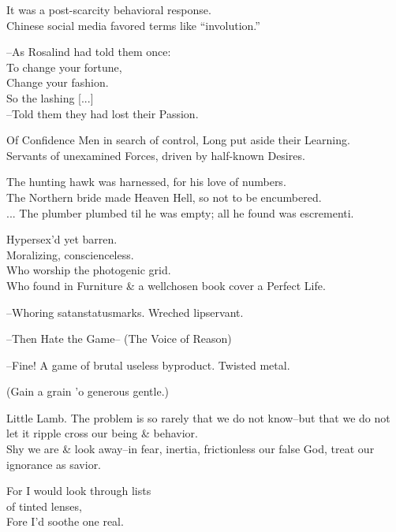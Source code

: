 \secdiv

It was a post-scarcity behavioral response. \\
Chinese social media favored terms like ``involution.''

--As Rosalind had told them once: \\
\qquad To change your fortune, \\
\qquad Change your fashion. \\
\qquad So the lashing [...] \\
--Told them they had lost their Passion.

Of Confidence Men in search of control, Long put aside their Learning. \\
Servants of unexamined Forces, driven by half-known Desires. 

The hunting hawk was harnessed, for his love of numbers. \\
The Northern bride made Heaven Hell, so not to be encumbered. \\
...
The plumber plumbed til he was empty; all he found was escrementi.

Hypersex'd yet barren. \\
Moralizing, conscienceless. \\
Who worship the photogenic grid. \\
Who found in Furniture \& a wellchosen book cover a Perfect Life. 

--Whoring satanstatusmarks. Wreched lipservant.

--Then Hate the Game-- (The Voice of Reason)

--Fine! A game of brutal useless byproduct. Twisted metal.

(Gain a grain 'o generous gentle.)

Little Lamb. The problem is so rarely that we do not know--but that we do not let it ripple cross our being \& behavior. \\
Shy we are \& look away--in fear, inertia, frictionless our false God, treat our ignorance as savior.

For I would look through lists \\
\qquad of tinted lenses, \\
Fore I'd soothe one real.